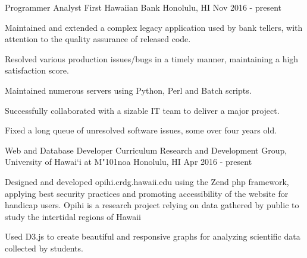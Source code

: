 \begin{cventries}
   	\cventry
    {Programmer Analyst}
    {First Hawaiian Bank}
    {Honolulu, HI}
    {Nov 2016 - present}
    {
        \begin{cvitems}
            \item {Maintained and extended a complex legacy application used by bank tellers, with attention to the quality assurance of released code.}
            \item {Resolved various production issues/bugs in a timely manner, maintaining a high satisfaction score.}
            \item {Maintained numerous servers using Python, Perl and Batch scripts.}
            \item {Successfully collaborated with a sizable IT team to deliver a major project.}
            \item {Fixed a long queue of unresolved software issues, some over four years old.}
        \end{cvitems}
    }

	\cventry
	{Web and Database Developer}
	{Curriculum Research and Development Group, University of Hawai`i at M{\char"101}noa}
	{Honolulu, HI}
	{Apr 2016 - present}
	{
		\begin{cvitems}
			\item {Designed and developed opihi.crdg.hawaii.edu using the Zend php framework, applying best security practices and promoting accessibility of the website for handicap users. Opihi is a research project relying on data gathered by public to study the intertidal regions of Hawaii}
			\item {Used D3.js to create beautiful and responsive graphs for analyzing scientific data collected by students.}
		\end{cvitems}
	}



\end{cventries}
